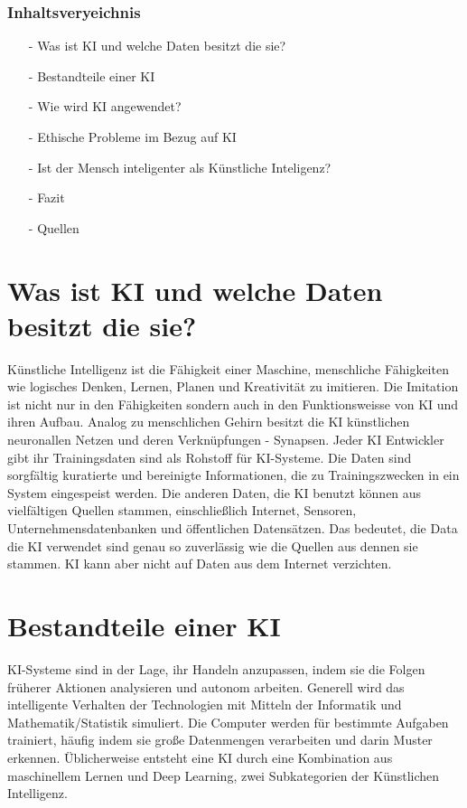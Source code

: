 \documentclass{report}
\begin{document}
\subsection{Inhaltsveryeichnis}

\begin{itemize}
\item[-] Was ist KI und welche Daten besitzt die sie?
\item[-] Bestandteile einer KI
\item[-] Wie wird KI angewendet?
\item[-] Ethische Probleme im Bezug auf KI
\item[-] Ist der Mensch inteligenter als Künstliche Inteligenz? 
\item[-] Fazit
\item[-] Quellen 


\end{itemize}

\chapter{Was ist KI und welche Daten besitzt die sie?}

Künstliche Intelligenz ist die Fähigkeit einer Maschine, menschliche Fähigkeiten wie logisches Denken, 
Lernen, Planen und Kreativität zu imitieren. Die Imitation ist nicht nur in den Fähigkeiten sondern auch in den 
Funktionsweisse von KI und ihren Aufbau. Analog zu menschlichen Gehirn besitzt die KI künstlichen neuronallen Netzen und 
deren Verknüpfungen - Synapsen. Jeder KI Entwickler gibt ihr Trainingsdaten sind als Rohstoff für KI-Systeme. Die Daten sind sorgfältig 
kuratierte und bereinigte Informationen, die zu Trainingszwecken in ein System eingespeist werden.
Die anderen Daten, die KI benutzt können aus vielfältigen Quellen stammen, einschließlich Internet, Sensoren,
  Unternehmensdatenbanken und öffentlichen Datensätzen. Das bedeutet, die Data die KI verwendet sind genau so zuverlässig wie die Quellen aus dennen sie stammen.
KI kann aber nicht auf Daten aus dem Internet verzichten.  

   \chapter{Bestandteile einer KI}
 
KI-Systeme sind in der Lage, ihr Handeln anzupassen, indem sie die Folgen früherer Aktionen analysieren und autonom arbeiten.
 Generell wird das intelligente Verhalten der 
Technologien mit Mitteln der Informatik und Mathematik/Statistik simuliert.
 Die Computer werden für bestimmte Aufgaben trainiert, häufig indem sie große Datenmengen 
 verarbeiten und darin Muster erkennen. Üblicherweise entsteht eine KI durch eine Kombination aus maschinellem
  Lernen und Deep Learning, zwei Subkategorien der Künstlichen Intelligenz.
\end{document}
